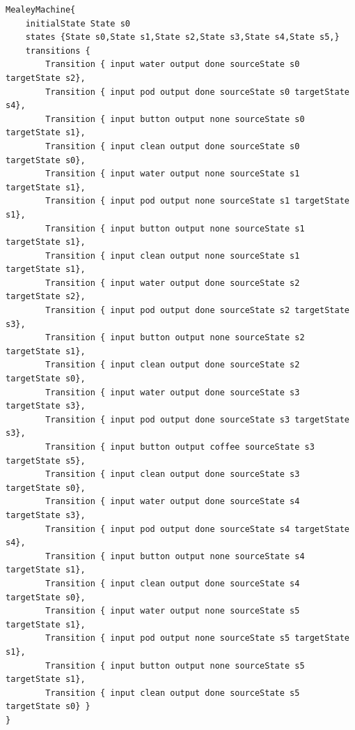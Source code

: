 \begin{lstlisting}[caption=The output MealyMachine after running the implemented DHC algorithm with the input seen in Listing \ref{li:coffeemealy}.,label=li:coffeetttret]
MealeyMachine{
	initialState State s0
	states {State s0,State s1,State s2,State s3,State s4,State s5,}
	transitions {
		Transition { input water output done sourceState s0 targetState s2},
		Transition { input pod output done sourceState s0 targetState s4},
		Transition { input button output none sourceState s0 targetState s1},
		Transition { input clean output done sourceState s0 targetState s0},
		Transition { input water output none sourceState s1 targetState s1},
		Transition { input pod output none sourceState s1 targetState s1},
		Transition { input button output none sourceState s1 targetState s1},
		Transition { input clean output none sourceState s1 targetState s1},
		Transition { input water output done sourceState s2 targetState s2},
		Transition { input pod output done sourceState s2 targetState s3},
		Transition { input button output none sourceState s2 targetState s1},
		Transition { input clean output done sourceState s2 targetState s0},
		Transition { input water output done sourceState s3 targetState s3},
		Transition { input pod output done sourceState s3 targetState s3},
		Transition { input button output coffee sourceState s3 targetState s5},
		Transition { input clean output done sourceState s3 targetState s0},
		Transition { input water output done sourceState s4 targetState s3},
		Transition { input pod output done sourceState s4 targetState s4},
		Transition { input button output none sourceState s4 targetState s1},
		Transition { input clean output done sourceState s4 targetState s0},
		Transition { input water output none sourceState s5 targetState s1},
		Transition { input pod output none sourceState s5 targetState s1},
		Transition { input button output none sourceState s5 targetState s1},
		Transition { input clean output done sourceState s5 targetState s0} }
}
\end{lstlisting}